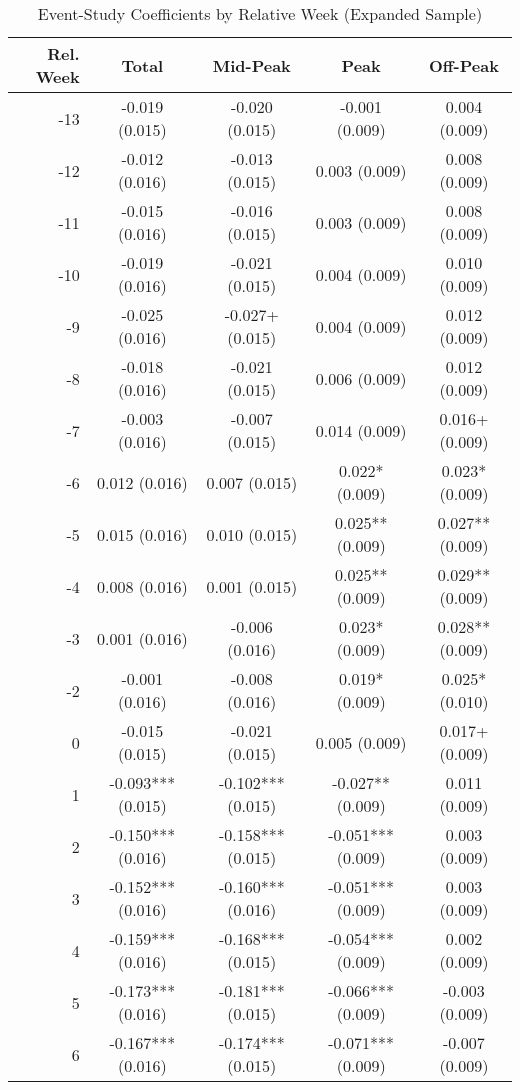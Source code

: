 \begin{table}[H]
\centering
\caption{Event-Study Coefficients by Relative Week (Expanded Sample)}
\label{tab:eventstudy_coefs_expanded}
\begin{tabular*}{\textwidth}{@{\extracolsep{\fill}}rcccc}
\toprule
Rel. Week & Total & Mid-Peak & Peak & Off-Peak
\\
\midrule
-13 & -0.019 (0.015) & -0.020 (0.015) & -0.001 (0.009) & 0.004 (0.009) \\
-12 & -0.012 (0.016) & -0.013 (0.015) & 0.003 (0.009) & 0.008 (0.009) \\
-11 & -0.015 (0.016) & -0.016 (0.015) & 0.003 (0.009) & 0.008 (0.009) \\
-10 & -0.019 (0.016) & -0.021 (0.015) & 0.004 (0.009) & 0.010 (0.009) \\
 -9 & -0.025 (0.016) & -0.027+ (0.015) & 0.004 (0.009) & 0.012 (0.009) \\
 -8 & -0.018 (0.016) & -0.021 (0.015) & 0.006 (0.009) & 0.012 (0.009) \\
 -7 & -0.003 (0.016) & -0.007 (0.015) & 0.014 (0.009) & 0.016+ (0.009) \\
 -6 & 0.012 (0.016) & 0.007 (0.015) & 0.022* (0.009) & 0.023* (0.009) \\
 -5 & 0.015 (0.016) & 0.010 (0.015) & 0.025** (0.009) & 0.027** (0.009) \\
 -4 & 0.008 (0.016) & 0.001 (0.015) & 0.025** (0.009) & 0.029** (0.009) \\
 -3 & 0.001 (0.016) & -0.006 (0.016) & 0.023* (0.009) & 0.028** (0.009) \\
 -2 & -0.001 (0.016) & -0.008 (0.016) & 0.019* (0.009) & 0.025* (0.010) \\
  0 & -0.015 (0.015) & -0.021 (0.015) & 0.005 (0.009) & 0.017+ (0.009) \\
  1 & -0.093*** (0.015) & -0.102*** (0.015) & -0.027** (0.009) & 0.011 (0.009) \\
  2 & -0.150*** (0.016) & -0.158*** (0.015) & -0.051*** (0.009) & 0.003 (0.009) \\
  3 & -0.152*** (0.016) & -0.160*** (0.016) & -0.051*** (0.009) & 0.003 (0.009) \\
  4 & -0.159*** (0.016) & -0.168*** (0.015) & -0.054*** (0.009) & 0.002 (0.009) \\
  5 & -0.173*** (0.016) & -0.181*** (0.015) & -0.066*** (0.009) & -0.003 (0.009) \\
  6 & -0.167*** (0.016) & -0.174*** (0.015) & -0.071*** (0.009) & -0.007 (0.009) \\

\end{tabular*}
\end{table}
